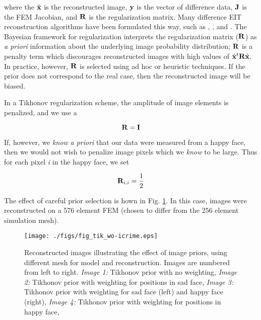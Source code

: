 \documentclass[12pt]{iopart}
\begin{document}
where the $\hat{\bf x}$ is the reconstructed image, 
$\bf y$ is the vector of difference data,
$\bf J$ is the FEM Jacobian, 
and $\bf R$ is the regularization matrix. Many 
difference EIT reconstruction algorithms have been
formulated this way, such as
\cite{Cheney_etal_1990}, \cite{Adler_and_Guardo_1996},
and \cite{Polydorides_2002}.
The Bayesian framework for regularization interprets
the regularization matrix ($\bf R$) as {\em a priori} information 
about the underlying image probability distribution;
$\bf R$ is a penalty term which discourages reconstructed
images with high values of $\hat{\bf x}^t{\bf R}\hat{\bf x}$.
In practice, however, $\bf R$ is selected using
ad hoc or heuristic techniques. If the prior does
not correspond to the real case, then the reconstructed
image will be biased.

In a Tikhonov regularization scheme, the amplitude
of image elements is penalized, and we use a

\begin{equation}
   {\bf R} = {\bf I}
\end{equation}

If, however, we {\em know} {\em a priori} that 
our data were measured from a happy face, then we 
would not wish to penalize image pixels which we
{\em know} to be large. Thus for each pixel {\em i}
in the happy face, we set 

\begin{equation}
   {\bf R}_{i,i} = \frac{1}{2}
\end{equation}

The effect of careful prior selection is hown in
Fig. \ref{fig:tikprior}.
In this case, images were reconstructed on a 576 element
FEM (chosen to differ from the 256 element simulation mesh).


%
%
\begin{figure}[th]
\begin{flushright}
\texttt{[image: ./figs/fig\_tik\_wo-icrime.eps]}
\caption{\small 
Reconstructed images illustrating the effect of image priors,
using different mesh for model and reconstruction.
Images are numbered from left to right.
{\em Image 1:} Tikhonov prior with no weighting,
{\em Image 2:} Tikhonov prior with weighting for positions in sad face,
{\em Image 3:} Tikhonov prior with weighting for sad face (left) and
happy face (right),
{\em Image 4:} Tikhonov prior with weighting for positions in happy face,
 }
 \label{fig:tikprior}
\end{flushright}
\end{figure}
\end{document}
